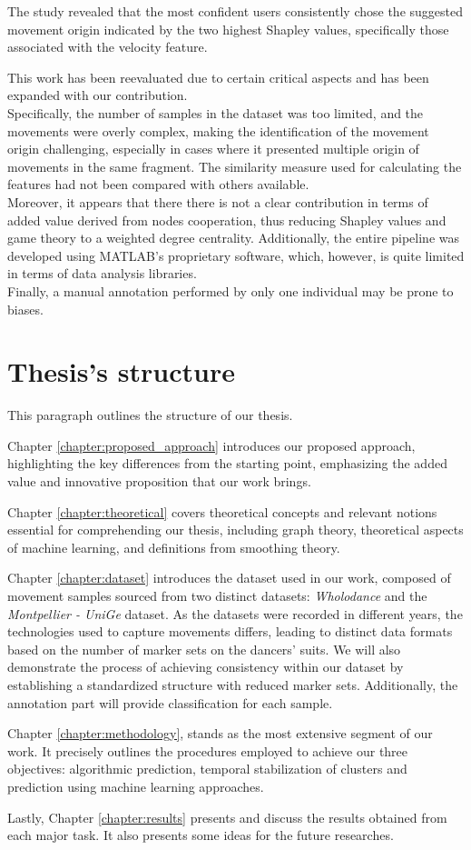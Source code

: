 The study revealed that the most confident users consistently chose the suggested movement origin indicated by the two highest Shapley values, specifically those associated with the velocity feature.

This work has been reevaluated due to certain critical aspects and has been expanded with our contribution.\\
Specifically, the number of samples in the dataset was too limited, and the movements were overly complex, making the identification of the movement origin challenging, especially in cases where it presented multiple origin of movements in the same fragment.
The similarity measure used for calculating the features had not been compared with others available. \\
Moreover, it appears that there there is not a clear contribution in terms of added value derived from nodes cooperation, thus reducing Shapley values and game theory to a weighted degree centrality.
Additionally, the entire pipeline was developed using MATLAB's proprietary software, which, however, is quite limited in terms of data analysis libraries.\\
Finally, a manual annotation performed by only one individual may be prone to biases.


\section{Thesis's structure}
This paragraph outlines the structure of our thesis. 

Chapter \ref{chapter:proposed_approach} introduces our proposed approach, highlighting the key differences from the starting point, emphasizing the added value and innovative proposition that our work brings. 

Chapter \ref{chapter:theoretical} covers theoretical concepts and relevant notions essential for comprehending our thesis, including graph theory, theoretical aspects of machine learning, and definitions from smoothing theory. 

Chapter \ref{chapter:dataset} introduces the dataset used in our work, composed of movement samples sourced from two distinct datasets: \textit{Wholodance} and the \textit{Montpellier - UniGe} dataset.
As the datasets were recorded in different years, the technologies used to capture movements differs, leading to distinct data formats based on the number of marker sets on the dancers' suits.
We will also demonstrate the process of achieving consistency within our dataset by establishing a standardized structure with reduced marker sets.
Additionally, the annotation part will provide classification for each sample. 

Chapter \ref{chapter:methodology}, stands as the most extensive segment of our work.
It precisely outlines the procedures employed to achieve our three objectives: algorithmic prediction, temporal stabilization of clusters and prediction using machine learning approaches.

Lastly, Chapter \ref{chapter:results} presents and discuss the results obtained from each major task. It also presents some ideas for the future researches.